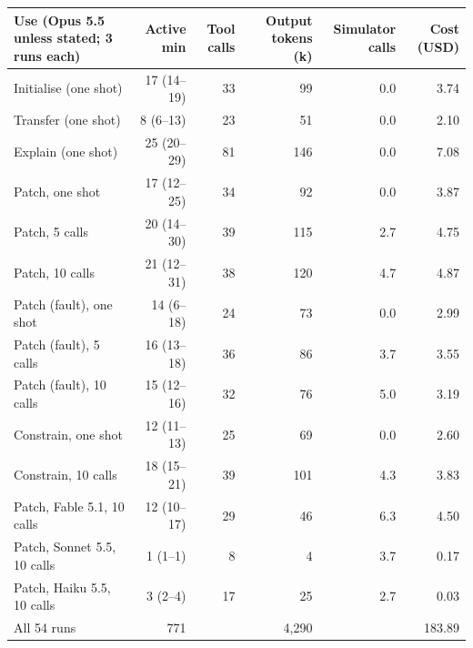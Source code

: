 \begin{tabular}{lrrrrr}
\toprule
Use (Opus 5.5 unless stated; 3 runs each) & Active min & Tool calls & Output tokens (k) & Simulator calls & Cost (USD) \\
\midrule
Initialise (one shot) & 17 (14--19) & 33 & 99 & 0.0 & 3.74 \\
Transfer (one shot) & 8 (6--13) & 23 & 51 & 0.0 & 2.10 \\
Explain (one shot) & 25 (20--29) & 81 & 146 & 0.0 & 7.08 \\
Patch, one shot & 17 (12--25) & 34 & 92 & 0.0 & 3.87 \\
Patch, 5 calls & 20 (14--30) & 39 & 115 & 2.7 & 4.75 \\
Patch, 10 calls & 21 (12--31) & 38 & 120 & 4.7 & 4.87 \\
Patch (fault), one shot & 14 (6--18) & 24 & 73 & 0.0 & 2.99 \\
Patch (fault), 5 calls & 16 (13--18) & 36 & 86 & 3.7 & 3.55 \\
Patch (fault), 10 calls & 15 (12--16) & 32 & 76 & 5.0 & 3.19 \\
Constrain, one shot & 12 (11--13) & 25 & 69 & 0.0 & 2.60 \\
Constrain, 10 calls & 18 (15--21) & 39 & 101 & 4.3 & 3.83 \\
Patch, Fable 5.1, 10 calls & 12 (10--17) & 29 & 46 & 6.3 & 4.50 \\
Patch, Sonnet 5.5, 10 calls & 1 (1--1) & 8 & 4 & 3.7 & 0.17 \\
Patch, Haiku 5.5, 10 calls & 3 (2--4) & 17 & 25 & 2.7 & 0.03 \\
\midrule
All 54 runs & 771 & & 4{,}290 & & 183.89 \\
\bottomrule
\end{tabular}
